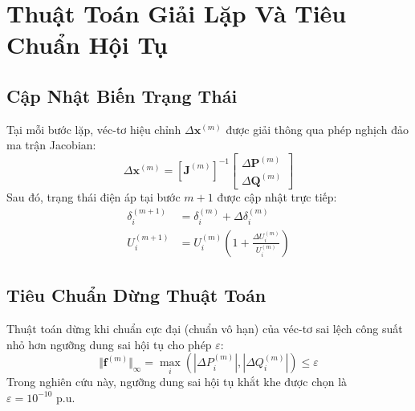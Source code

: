 \documentclass[12pt,a4paper,oneside]{report}
\begin{document}
\section{Thuật Toán Giải Lặp Và Tiêu Chuẩn Hội Tụ}

\subsection{Cập Nhật Biến Trạng Thái}
Tại mỗi bước lặp, véc-tơ hiệu chỉnh $\Delta \mathbf{x}^{(m)}$ được giải thông qua phép nghịch đảo ma trận Jacobian:
\begin{equation}
\Delta \mathbf{x}^{(m)} = \left[ \mathbf{J}^{(m)} \right]^{-1}
\begin{bmatrix}
\Delta \mathbf{P}^{(m)} \\
\Delta \mathbf{Q}^{(m)}
\end{bmatrix}
\end{equation}
Sau đó, trạng thái điện áp tại bước $m+1$ được cập nhật trực tiếp:
\begin{align}
\delta_i^{(m+1)} &= \delta_i^{(m)} + \Delta \delta_i^{(m)} \\
U_i^{(m+1)} &= U_i^{(m)} \left( 1 + \frac{\Delta U_i^{(m)}}{U_i^{(m)}} \right)
\end{align}

\subsection{Tiêu Chuẩn Dừng Thuật Toán}
Thuật toán dừng khi chuẩn cực đại (chuẩn vô hạn) của véc-tơ sai lệch công suất nhỏ hơn ngưỡng dung sai hội tụ cho phép $\varepsilon$:
\begin{equation}
\Vert \mathbf{f}^{(m)} \Vert_\infty = \max_{i} \left( |\Delta P_i^{(m)}|, |\Delta Q_i^{(m)}| \right) \le \varepsilon
\end{equation}
Trong nghiên cứu này, ngưỡng dung sai hội tụ khắt khe được chọn là $\varepsilon = 10^{-10}\text{ p.u.}$
\end{document}
